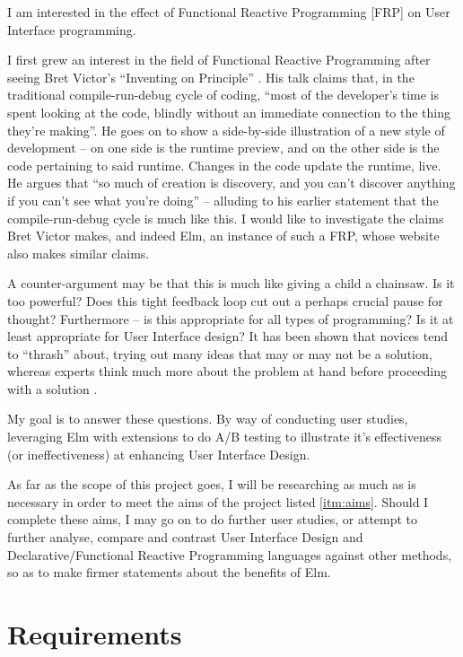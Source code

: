 I am interested in the effect of Functional Reactive Programming [FRP] on User
Interface programming. 

I first grew an interest in the field of Functional
Reactive Programming after seeing Bret Victor's ``Inventing on Principle''
\cite{Victor2012a}. His talk claims that, in the traditional compile-run-debug
cycle of coding, ``most of the developer's time is spent looking at the code,
blindly without an immediate connection to the thing they're making''. He goes
on to show a side-by-side illustration of a new style of development -- on one
side is the runtime preview, and on the other side is the code pertaining to
said runtime. Changes in the code update the runtime, live. He argues that ``so
much of creation is discovery, and you can't discover anything if you can't see
what you're doing'' -- alluding to his earlier statement that the
compile-run-debug cycle is much like this. I would like to investigate the
claims Bret Victor makes, and indeed Elm, an instance of such a FRP, whose website also makes
similar claims.

A counter-argument may be that this is much like giving a
child a chainsaw. Is it too powerful? Does this tight feedback loop cut out a
perhaps crucial pause for
thought? Furthermore -- is this appropriate for all types of programming? Is it
at least appropriate for User Interface design? It has been shown that novices
tend to ``thrash'' about, trying out many ideas that may or may not be a
solution,
whereas experts think much more about the problem at hand before proceeding with
a solution \cite{Lopez2012a}.

My goal is to answer these questions. By way of conducting user studies, 
leveraging Elm with extensions to do A/B testing to illustrate it's
effectiveness (or ineffectiveness) at enhancing User Interface Design. 

As far as the scope of this project goes, I will be researching as much as
is necessary in order to meet the aims of the project listed \ref{itm:aims}.
Should I complete these aims, I may go on to do further user studies, or attempt
to further analyse, compare and contrast User Interface Design and
Declarative/Functional Reactive Programming languages against other methods, so
as to make firmer statements about the benefits of Elm.

\chapter{Requirements}


